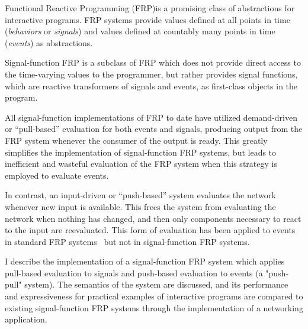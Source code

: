 Functional Reactive Programming (FRP)is a promising class of abstractions for
interactive programs. FRP systems provide values defined at all points in time
({\em behaviors} or {\em signals}) and values defined at countably many points
in time ({\em events}) as abstractions.

Signal-function FRP is a subclass of FRP which does not provide direct access to
the time-varying values to the programmer, but rather provides signal functions,
which are reactive transformers of signals and events, as first-class objects in the program. 

All signal-function implementations of FRP to date have utilized demand-driven
or ``pull-based''  evaluation for both events and signals, producing output from
the FRP system whenever the consumer of the output is ready. This greatly
simplifies the implementation of signal-function FRP systems, but leads to
inefficient and wasteful evaluation of the FRP system when this strategy is
employed to evaluate events.

In contrast, an input-driven or ``push-based'' system evaluates the network
whenever new input is available. This frees the system from evaluating the
network when nothing has changed, and then only components necessary to react to
the input are reevaluated. This form of evaluation has been applied to events in
standard FRP systems~\cite{Elliott2009} but not in signal-function FRP systems.

I describe the implementation of a signal-function FRP system which applies
pull-based evaluation to signals and push-based evaluation to events (a
"push-pull" system). The semantics of the system are discussed, and its
performance and expressiveness for practical examples of interactive programs
are compared to existing signal-function FRP systems through the implementation
of a networking application.
